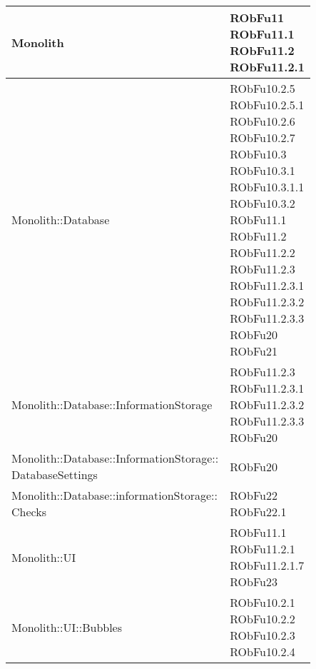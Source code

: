 \begin{center}
\begin{longtable}{|
*{1}{>{\centering\arraybackslash}m{7.5cm}|}
*{1}{>{\centering\arraybackslash}m{2.5cm}|}}
Monolith & \makecell{RObFu11
\\RObFu11.1
\\RObFu11.2
\\RObFu11.2.1
\\}\\\hline
Monolith::Database & \makecell{RObFu10.2.5
\\RObFu10.2.5.1
\\RObFu10.2.6
\\RObFu10.2.7
\\RObFu10.3
\\RObFu10.3.1
\\RObFu10.3.1.1
\\RObFu10.3.2
\\RObFu11.1
\\RObFu11.2
\\RObFu11.2.2
\\RObFu11.2.3
\\RObFu11.2.3.1
\\RObFu11.2.3.2
\\RObFu11.2.3.3
\\RObFu20
\\RObFu21
\\}\\\hline
Monolith::Database::InformationStorage & \makecell{RObFu11.2.3
\\RObFu11.2.3.1
\\RObFu11.2.3.2
\\RObFu11.2.3.3
\\RObFu20
\\}\\\hline
\makecell[l]{Monolith::Database::InformationStorage:: \\ \hfill DatabaseSettings} & \makecell{RObFu20
\\}\\\hline
\makecell[l]{Monolith::Database::informationStorage:: \\ \hfill Checks} & \makecell{RObFu22
\\RObFu22.1
\\}\\\hline
Monolith::UI & \makecell{RObFu11.1
\\RObFu11.2.1
\\RObFu11.2.1.7
\\RObFu23
\\}\\\hline
Monolith::UI::Bubbles & \makecell{RObFu10.2.1
\\RObFu10.2.2
\\RObFu10.2.3
\\RObFu10.2.4
}
\end{longtable}
\end{center}
